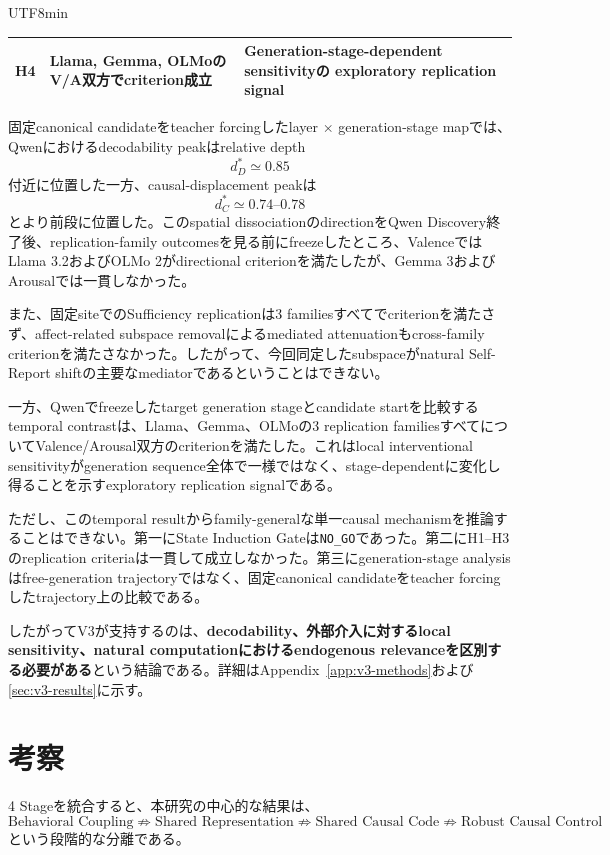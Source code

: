 \documentclass{article} %
\begin{document}
\begin{CJK*}{UTF8}{min}
\begin{table}[t]
\begin{tabularx}{\linewidth}{
@{}
>{\raggedright\arraybackslash}p{1.15cm}
>{\raggedright\arraybackslash}p{3.6cm}
>{\raggedright\arraybackslash}X
@{}
}
H4 &
Llama, Gemma, OLMoの
V/A双方でcriterion成立 &
Generation-stage-dependent sensitivityの
exploratory replication signal \\

\bottomrule
\end{tabularx}
\end{table}

固定canonical candidateをteacher forcingしたlayer $\times$ generation-stage mapでは、Qwenにおけるdecodability peakはrelative depth
\[
d_D^*\simeq0.85
\]
付近に位置した一方、causal-displacement peakは
\[
d_C^*\simeq0.74\text{--}0.78
\]
とより前段に位置した。このspatial dissociationのdirectionをQwen Discovery終了後、replication-family outcomesを見る前にfreezeしたところ、ValenceではLlama 3.2およびOLMo 2がdirectional criterionを満たしたが、Gemma 3およびArousalでは一貫しなかった。

また、固定siteでのSufficiency replicationは3 familiesすべてでcriterionを満たさず、affect-related subspace removalによるmediated attenuationもcross-family criterionを満たさなかった。したがって、今回同定したsubspaceがnatural Self-Report shiftの主要なmediatorであるということはできない。

一方、Qwenでfreezeしたtarget generation stageとcandidate startを比較するtemporal contrastは、Llama、Gemma、OLMoの3 replication familiesすべてについてValence/Arousal双方のcriterionを満たした。これはlocal interventional sensitivityがgeneration sequence全体で一様ではなく、stage-dependentに変化し得ることを示すexploratory replication signalである。

ただし、このtemporal resultからfamily-generalな単一causal mechanismを推論することはできない。第一にState Induction Gateは\texttt{NO\_GO}であった。第二にH1--H3のreplication criteriaは一貫して成立しなかった。第三にgeneration-stage analysisはfree-generation trajectoryではなく、固定canonical candidateをteacher forcingしたtrajectory上の比較である。

したがってV3が支持するのは、\textbf{decodability、外部介入に対するlocal sensitivity、natural computationにおけるendogenous relevanceを区別する必要がある}という結論である。詳細はAppendix~\ref{app:v3-methods}および\ref{sec:v3-results}に示す。


\section{考察}
\label{sec:main-discussion}

4 Stageを統合すると、本研究の中心的な結果は、
\[
\text{Behavioral Coupling}
\not\Rightarrow
\text{Shared Representation}
\not\Rightarrow
\text{Shared Causal Code}
\not\Rightarrow
\text{Robust Causal Control}
\]
という段階的な分離である。


\end{CJK*}
\end{document}
